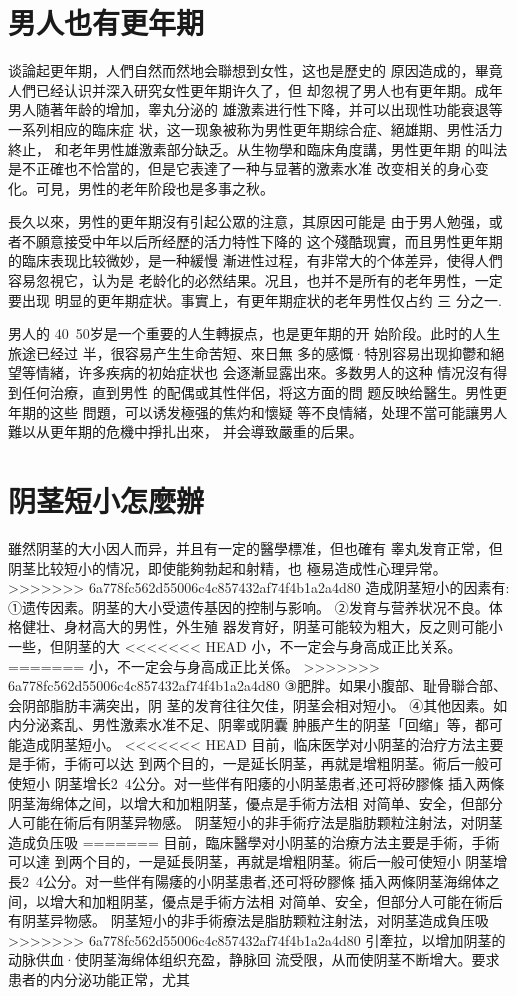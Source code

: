 \documentclass[12pt,UTF8]{ctexbook}
\begin{document}
\section{男人也有更年期}

谈論起更年期，人們自然而然地会聯想到女性，这也是歷史的
原因造成的，畢竟人們已经认识并深入研究女性更年期许久了，但
却忽視了男人也有更年期。成年男人随著年龄的增加，睾丸分泌的
雄激素进行性下降，并可以出现性功能衰退等一系列相应的臨床症
状，这一现象被称为男性更年期综合症、絕雄期、男性活力終止，
和老年男性雄激素部分缺乏。从生物學和臨床角度講，男性更年期
的叫法是不正確也不恰當的，但是它表達了一种与显著的激素水准
改变相关的身心变化。可見，男性的老年阶段也是多事之秋。

長久以來，男性的更年期沒有引起公眾的注意，其原因可能是
由于男人勉强，或者不願意接受中年以后所经歷的活力特性下降的
这个殘酷现實，而且男性更年期的臨床表现比较微妙，是一种緩慢
漸进性过程，有非常大的个体差异，使得人們容易忽視它，认为是
老龄化的必然结果。况且，也并不是所有的老年男性，一定要出现
明显的更年期症状。事實上，有更年期症状的老年男性仅占约 三
分之一.

男人的 40~50岁是一个重要的人生轉捩点，也是更年期的开
始阶段。此时的人生旅途已经过
半，很容易产生生命苦短、來日無
多的感慨·特別容易出现抑鬱和絕
望等情緒，许多疾病的初始症状也
会逐漸显露出來。多数男人的这种
情况沒有得到任何治療，直到男性
的配偶或其性伴侶，将这方面的問
题反映给醫生。男性更年期的这些
問題，可以诱发極强的焦灼和懷疑
等不良情緒，处理不當可能讓男人
難以从更年期的危機中掙扎出來，
并会導致嚴重的后果。

\section{阴茎短小怎麼辦}

雖然阴茎的大小因人而异，并且有一定的醫學標准，但也確有
睾丸发育正常，但阴茎比较短小的情况，即使能夠勃起和射精，也
極易造成性心理异常。
>>>>>>> 6a778fc562d55006c4c857432af74f4b1a2a4d80
造成阴茎短小的因素有:
①遗传因素。阴茎的大小受遗传基因的控制与影响。
②发育与营养状况不良。体格健壮、身材高大的男性，外生殖
器发育好，阴茎可能较为粗大，反之则可能小一些，但阴茎的大
<<<<<<< HEAD
小，不一定会与身高成正比关系。
=======
小，不一定会与身高成正比关係。
>>>>>>> 6a778fc562d55006c4c857432af74f4b1a2a4d80
③肥胖。如果小腹部、耻骨聯合部、会阴部脂肪丰满突出，阴
茎的发育往往欠佳，阴茎会相对短小。
④其他因素。如内分泌紊乱、男性激素水准不足、阴睾或阴囊
肿脹产生的阴茎「回缩」等，都可能造成阴茎短小。
<<<<<<< HEAD
目前，临床医学对小阴茎的治疗方法主要是手術，手術可以达
到两个目的，一是延长阴茎，再就是增粗阴茎。術后一般可使短小
阴茎增长2~4公分。对一些伴有阳痿的小阴茎患者,还可将矽膠條
插入两條阴茎海绵体之间，以增大和加粗阴茎，優点是手術方法相
对简单、安全，但部分人可能在術后有阴茎异物感。
阴茎短小的非手術疗法是脂肪颗粒注射法，对阴茎造成负压吸
=======
目前，臨床醫學对小阴茎的治療方法主要是手術，手術可以達
到两个目的，一是延長阴茎，再就是增粗阴茎。術后一般可使短小
阴茎增長2~4公分。对一些伴有陽痿的小阴茎患者,还可将矽膠條
插入两條阴茎海绵体之间，以增大和加粗阴茎，優点是手術方法相
对简单、安全，但部分人可能在術后有阴茎异物感。
阴茎短小的非手術療法是脂肪颗粒注射法，对阴茎造成負压吸
>>>>>>> 6a778fc562d55006c4c857432af74f4b1a2a4d80
引牽拉，以增加阴茎的动脉供血·使阴茎海绵体组织充盈，静脉回
流受限，从而使阴茎不断增大。要求患者的内分泌功能正常，尤其
\end{document}
